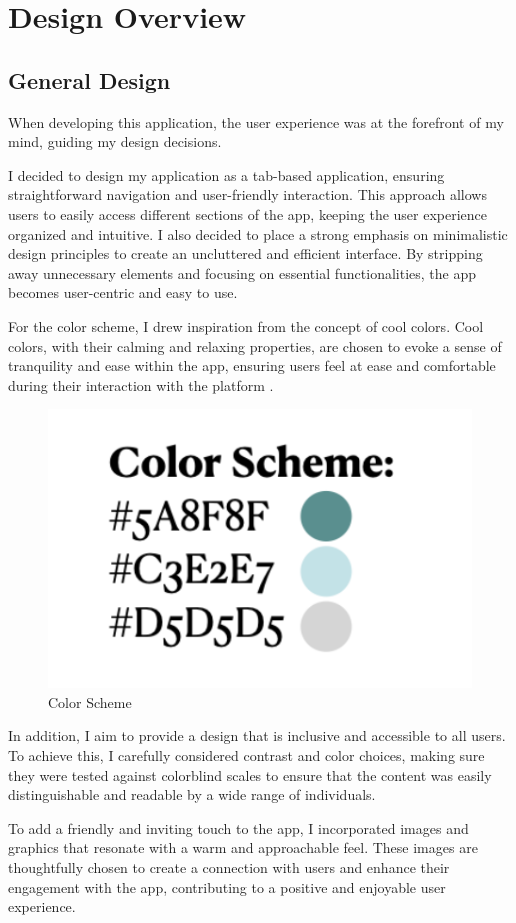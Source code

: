 \chapter{Design Overview}

\section{General Design}

When developing this application, the user experience was at the forefront of my mind, guiding my design decisions.

I decided to design my application as a tab-based application, ensuring straightforward navigation and user-friendly interaction. This approach allows users to easily access different sections of the app, keeping the user experience organized and intuitive. I also decided to place a strong emphasis on minimalistic design principles to create an uncluttered and efficient interface. By stripping away unnecessary elements and focusing on essential functionalities, the app becomes user-centric and easy to use.

For the color scheme, I drew inspiration from the concept of cool colors. Cool colors, with their calming and relaxing properties, are chosen to evoke a sense of tranquility and ease within the app, ensuring users feel at ease and comfortable during their interaction with the platform \cite{Bilucaglia}.

\begin{figure}[H]
    \centering
    \includegraphics[width=0.2\linewidth]{thesis//chapters//images/colorScheme.png}
    \caption{Color Scheme}
    \label{fig:color-scheme}
\end{figure}

In addition, I aim to provide a design that is inclusive and accessible to all users. To achieve this, I carefully considered contrast and color choices, making sure they were tested against colorblind scales to ensure that the content was easily distinguishable and readable by a wide range of individuals.

To add a friendly and inviting touch to the app, I incorporated images and graphics that resonate with a warm and approachable feel. These images are thoughtfully chosen to create a connection with users and enhance their engagement with the app, contributing to a positive and enjoyable user experience.

